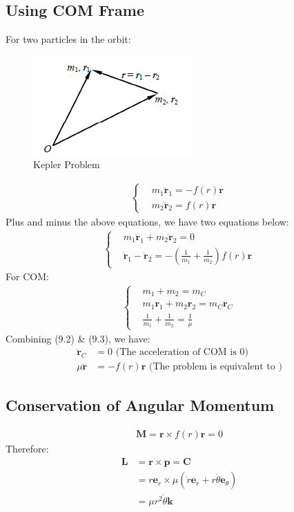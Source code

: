 \documentclass[11pt, a4paper, oneside]{book}
\numberwithin{equation}{section}%
\begin{document}
\subsection{Using COM Frame}
For two particles in the orbit:
\begin{figure}[H]
	\centering
	\includegraphics{"Kepler Problem"}
	\caption{Kepler Problem}
	\label{Kepler problem}
\end{figure}
\begin{align}
	\left\{
	\begin{aligned}
	&m_1\ddot{\textbf{r}}_1 = -f(r)\textbf{r}\\
	&m_2\ddot{\textbf{r}}_2 = f(r)\textbf{r}
	\end{aligned}
	\right.
\end{align}
	Plus and minus the above equations, we have two equations below:
\begin{align}
	\left\{
	\begin{aligned}
	&m_1\ddot{\textbf{r}}_1 + m_2 \ddot{\textbf{r}}_2 =0\\
	&\ddot{\textbf{r}}_1 - \ddot{\textbf{r}}_2 = -\left(\frac{1}{m_1}+\frac{1}{m_2}\right)f(r)\textbf{r}
	\end{aligned}
	\right.
\end{align}
	For COM:
\begin{align}
	\left\{
	\begin{aligned}
	&m_1 + m_2 = m_C\\
	&m_1\textbf{r}_1 + m_2\textbf{r}_2 = m_C\textbf{r}_C\\
	&\frac{1}{m_1}+\frac{1}{m_2} = \frac{1}{\mu}
	\end{aligned}
	\right.
\end{align}
	Combining (9.2) \& (9.3), we have:
\begin{align}
		\ddot{\textbf{r}}_C &= 0 \text{ (The acceleration of COM is 0)}\\
		\mu \ddot{\textbf{r}} &= - f(r)\textbf{r} \text{ (The problem is equivalent to )}
\end{align}

\subsection{Conservation of Angular Momentum}
\begin{align}
	\bm{M} = \bm{r} \times f(r)\bm{r} = 0
\end{align}
Therefore:
\begin{align}
	\bm{L} &= \bm{r} \times \bm{p} = \bm{C}\\
	&= r\bm{e}_r \times \mu(\dot{r}\bm{e}_r + r\dot{\theta}\bm{e}_\theta) \\
	&= \mu r^2 \dot{\theta} \bm{k}
\end{align}
\end{document}
